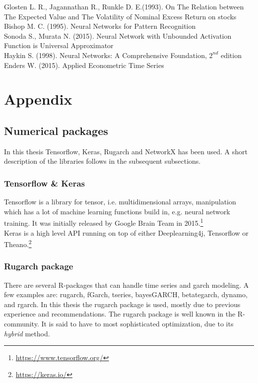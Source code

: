 \documentclass[12pt, letterpaper]{amsart}%
\begin{document}
Glosten L. R., Jagannathan R., Runkle D. E.(1993). On The Relation between The Expected Value and The Volatility of Nominal Excess Return on stocks
\\



Bishop M. C. (1995). Neural Networks for Pattern Recognition
\\

Sonoda S., Murata N. (2015). Neural Network with Unbounded Activation Function is Universal Approximator
\\

Haykin S. (1998). Neural Networks: A Comprehensive Foundation, $2^{nd}$ edition
\\

Enders W. (2015). Applied Econometric Time Series

\newpage

\section{Appendix}

\subsection{Numerical packages}
In this thesis Tensorflow, Keras, Rugarch and NetworkX has been used. A short description of the libraries follows in the subsequent subsections.

\subsubsection{Tensorflow \& Keras}
Tensorflow is a library for tensor, i.e. multidimensional arrays, manipulation which has a lot of machine learning functions build in, e.g. neural network training. It was initially released by Google Brain Team in 2015.\footnote{\url{https://www.tensorflow.org/}}
\\

Keras is a high level API running on top of either Deeplearning4j, Tensorflow or Theano.\footnote{\url{https://keras.io/}}

\subsubsection{Rugarch package}
There are several R-packages that can handle time series and garch modeling. A few examples are: rugarch, fGarch, tseries, bayesGARCH, betategarch, dynamo, and rgarch. In this thesis the rugarch package is used, mostly due to previous experience and recommendations. The rugarch package is well known in the R-community. It is said to have to most sophisticated optimization, due to its \textit{hybrid} method.
\\
\end{document}
